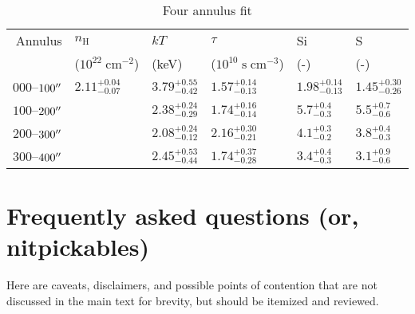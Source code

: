 \documentclass[preprint2,tighten,trackchanges]{aastex6}
\newcommand*{\mt}{\mathrm}
\newcommand*{\unit}[1]{\;\mt{#1}}  %
\begin{document}
\begin{table*}
    \centering
    \caption{Four annulus fit \label{tab:fourann-stock}}
    \begin{tabular}{@{}rlllll@{}}
        \toprule
        Annulus & $n_\mathrm{H}$ & $kT$ & $\tau$ & Si & S \\
         & ($10^{22} \unit{cm^{-2}}$) & (keV) & ($10^{10} \unit{s\;cm^{-3}}$) & (-) & (-) \\
        \midrule
        $000$--$100\mbox{$^{\prime\prime}$}$ & ${2.11}^{+0.04}_{-0.07}$ & ${3.79}^{+0.55}_{-0.42}$ & ${1.57}^{+0.14}_{-0.13}$ & ${1.98}^{+0.14}_{-0.13}$ & ${1.45}^{+0.30}_{-0.26}$ \\
        $100$--$200\mbox{$^{\prime\prime}$}$ &                       & ${2.38}^{+0.24}_{-0.29}$ & ${1.74}^{+0.16}_{-0.14}$ & ${5.7}^{+0.4}_{-0.3}$ & ${5.5}^{+0.7}_{-0.6}$ \\
        $200$--$300\mbox{$^{\prime\prime}$}$ &                       & ${2.08}^{+0.24}_{-0.12}$ & ${2.16}^{+0.30}_{-0.21}$ & ${4.1}^{+0.3}_{-0.2}$ & ${3.8}^{+0.4}_{-0.3}$ \\
        $300$--$400\mbox{$^{\prime\prime}$}$ &                       & ${2.45}^{+0.53}_{-0.44}$ & ${1.74}^{+0.37}_{-0.28}$ & ${3.4}^{+0.4}_{-0.3}$ & ${3.1}^{+0.9}_{-0.6}$ \\
        \bottomrule
    \end{tabular}
\end{table*}


\section{Frequently asked questions (or, nitpickables)}

Here are caveats, disclaimers, and possible points of contention that are not
discussed in the main text for brevity, but should be itemized and reviewed.
\end{document}
